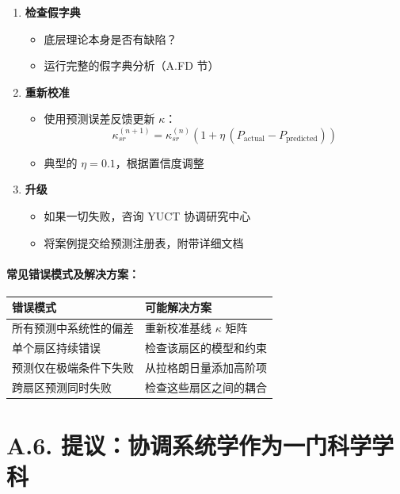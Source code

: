 \documentclass[11pt,a4paper]{article}
\begin{document}
\begin{enumerate}
		\item \textbf{检查假字典}
		\begin{itemize}
			\item 底层理论本身是否有缺陷？
			\item 运行完整的假字典分析（A.FD 节）
		\end{itemize}
		
		\item \textbf{重新校准}
		\begin{itemize}
			\item 使用预测误差反馈更新 $\kappa$：
			\[
			\kappa_{sr}^{(n+1)} = \kappa_{sr}^{(n)}\left(1+\eta\,(P_{\mathrm{actual}}-P_{\mathrm{predicted}})\right)
			\]
			\item 典型的 $\eta = 0.1$，根据置信度调整
		\end{itemize}
		
		\item \textbf{升级}
		\begin{itemize}
			\item 如果一切失败，咨询 YUCT 协调研究中心
			\item 将案例提交给预测注册表，附带详细文档
		\end{itemize}
	\end{enumerate}
	
	\paragraph*{常见错误模式及解决方案：}
	
	\begin{tabularx}{\textwidth}{|l|X|}
		\hline
		\textbf{错误模式} & \textbf{可能解决方案} \\
		\hline
		所有预测中系统性的偏差 & 重新校准基线 $\kappa$ 矩阵 \\
		\hline
		单个扇区持续错误 & 检查该扇区的模型和约束 \\
		\hline
		预测仅在极端条件下失败 & 从拉格朗日量添加高阶项 \\
		\hline
		跨扇区预测同时失败 & 检查这些扇区之间的耦合 \\
		\hline
	\end{tabularx}
	
	\section*{A.6. 提议：协调系统学作为一门科学学科}
	
\end{document}
